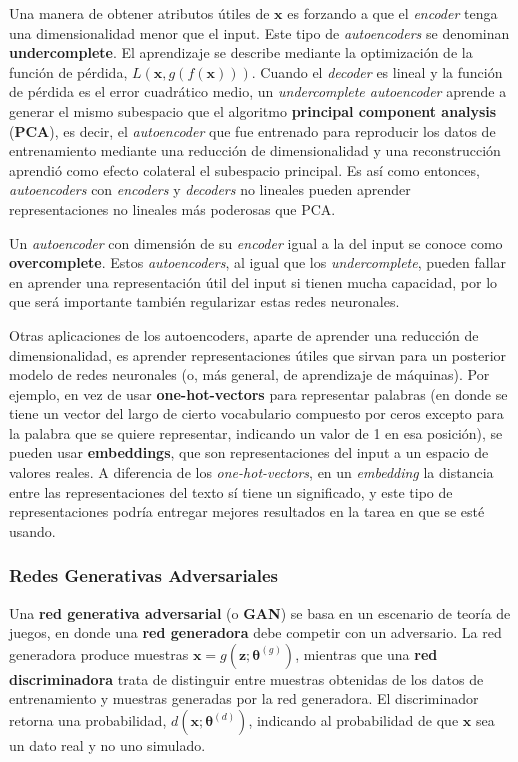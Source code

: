 Una manera de obtener atributos \'utiles de $\bm{x}$ es forzando a que el \textit{encoder} tenga una dimensionalidad menor que el input. Este tipo de \textit{autoencoders} se denominan \textbf{undercomplete}. El aprendizaje se describe mediante la optimizaci\'on de la funci\'on de p\'erdida, $L(\bm{x}, g(f(\bm{x})))$. Cuando el \textit{decoder} es lineal y la funci\'on de p\'erdida es el error cuadr\'atico medio, un \textit{undercomplete autoencoder} aprende a generar el mismo subespacio que el algoritmo \textbf{principal component analysis} (\textbf{PCA}), es decir, el \textit{autoencoder} que fue entrenado para reproducir los datos de entrenamiento mediante una reducci\'on de dimensionalidad y una reconstrucci\'on aprendi\'o como efecto colateral el subespacio principal. Es as\'i como entonces, \textit{autoencoders} con \textit{encoders} y \textit{decoders} no lineales pueden aprender representaciones no lineales m\'as poderosas que PCA.

Un \textit{autoencoder} con dimensi\'on de su \textit{encoder} igual a la del input se conoce como \textbf{overcomplete}. Estos \textit{autoencoders}, al igual que los \textit{undercomplete}, pueden fallar en aprender una representaci\'on \'util del input si tienen mucha capacidad, por lo que ser\'a importante tambi\'en regularizar estas redes neuronales.

Otras aplicaciones de los autoencoders, aparte de aprender una reducci\'on de dimensionalidad, es aprender representaciones \'utiles que sirvan para un posterior modelo de redes neuronales (o, m\'as general, de aprendizaje de m\'aquinas). Por ejemplo, en vez de usar \textbf{one-hot-vectors} para representar palabras (en donde se tiene un vector del largo de cierto vocabulario compuesto por ceros excepto para la palabra que se quiere representar, indicando un valor de 1 en esa posici\'on), se pueden usar \textbf{embeddings}, que son representaciones del input a un espacio de valores reales. A diferencia de los \textit{one-hot-vectors}, en un \textit{embedding} la distancia entre las representaciones del texto s\'i tiene un significado, y este tipo de representaciones podr\'ia entregar mejores resultados en la tarea en que se est\'e usando.

\subsubsection{Redes Generativas Adversariales}

Una \textbf{red generativa adversarial} (o \textbf{GAN}) se basa en un escenario de teor\'ia de juegos, en donde una \textbf{red generadora} debe competir con un adversario. La red generadora produce muestras $\bm{x} = g(\bm{z};\bm{\theta}^{(g)})$, mientras que una \textbf{red discriminadora} trata de distinguir entre muestras obtenidas de los datos de entrenamiento y muestras generadas por la red generadora. El discriminador retorna una probabilidad, $d(\bm{x};\bm{\theta}^{(d)})$, indicando al probabilidad de que $\bm{x}$ sea un dato real y no uno simulado.

